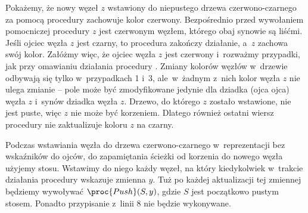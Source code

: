 \exercise %
Pokażemy, że nowy węzeł $z$ wstawiony do niepustego drzewa czerwono-czarnego za pomocą procedury  zachowuje kolor czerwony.
Bezpośrednio przed wywołaniem pomocniczej procedury  $z$ jest czerwonym węzłem, którego obaj synowie są liśćmi.
Jeśli ojciec węzła $z$ jest czarny, to procedura zakończy działanie, a~$z$ zachowa swój kolor.
Załóżmy więc, że ojciec węzła $z$ jest czerwony i~rozważmy przypadki, jak przy omawianiu działania procedury .
Zmiany kolorów węzłów w~drzewie odbywają się tylko w~przypadkach 1 i~3, ale~w~żadnym z~nich kolor węzła $z$ nie ulega zmianie -- pole  może być zmodyfikowane jedynie dla dziadka (ojca ojca) węzła $z$ i~synów dziadka węzła $z$.
Drzewo, do którego $z$ zostało wstawione, nie jest puste, więc $z$ nie może być korzeniem.
Dlatego również ostatni wiersz procedury  nie zaktualizuje koloru $z$ na czarny.

\exercise %
Podczas wstawiania węzła do drzewa czerwono-czarnego w~reprezentacji bez wskaźników do ojców, do zapamiętania ścieżki od korzenia do nowego węzła użyjemy stosu.
Wstawimy do niego każdy węzeł, na który kiedykolwiek w~trakcie działania procedury  wskazuje zmienna $y$.
Tuż po każdej aktualizacji tej zmiennej będziemy wywoływać $\proc{Push}(S,y)$, gdzie $S$ jest początkowo pustym stosem.
Ponadto przypisanie z~linii 8 nie będzie wykonywane.

